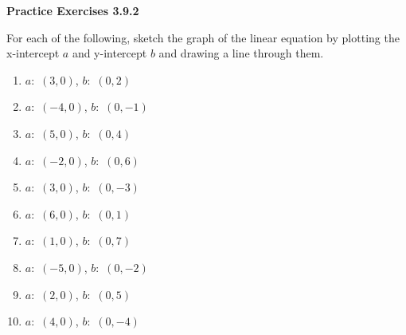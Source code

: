  \vspace{1ex}
\noindent\textbf{Practice Exercises 3.9.2}

\vspace{0.75ex}

For each of the following, sketch the graph of the linear equation by plotting the x-intercept $ a $ and y-intercept $b$ and drawing a line through them.
\begin{multicols}{2}
\begin{enumerate}[noitemsep, label = \color{blue}\arabic*. ]
    \item $ a:$  $(3, 0)$, $ b:$  $(0, 2)$
    \item $ a:$  $(-4, 0)$, $ b:$  $(0, -1)$
    \item $ a:$  $(5, 0)$, $ b:$  $(0, 4)$
    \item $ a:$  $(-2, 0)$, $ b:$  $(0, 6)$
    \item $ a:$  $(3, 0)$, $ b:$  $(0, -3)$
    \item $ a:$  $(6, 0)$, $ b:$  $(0, 1)$
    \item $ a:$  $(1, 0)$, $ b:$  $(0, 7)$
    \item $ a:$  $(-5, 0)$, $ b:$  $(0, -2)$
    \item $ a:$  $(2, 0)$, $ b:$  $(0, 5)$
    \item $ a:$  $(4, 0)$, $ b:$  $(0, -4)$
\end{enumerate}
\end{multicols}
